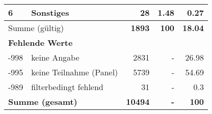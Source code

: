 \begin{longtable}{lXrrr}
     6 &
     \multicolumn{1}{X}{ Sonstiges   } &


       \num{28} &
       \num[round-mode=places,round-precision=2]{1.48} &
         \num[round-mode=places,round-precision=2]{0.27} \\
     \midrule
     \multicolumn{2}{l}{Summe (gültig)} &
       \textbf{\num{1893}} &
     \textbf{\num{100}} &
       \textbf{\num[round-mode=places,round-precision=2]{18.04}} \\
     \multicolumn{5}{l}{\textbf{Fehlende Werte}}\\
       -998 &
       keine Angabe &
         \num{2831} &
        - &
         \num[round-mode=places,round-precision=2]{26.98} \\
       -995 &
       keine Teilnahme (Panel) &
         \num{5739} &
        - &
         \num[round-mode=places,round-precision=2]{54.69} \\
       -989 &
       filterbedingt fehlend &
         \num{31} &
        - &
         \num[round-mode=places,round-precision=2]{0.3} \\
     \midrule
     \multicolumn{2}{l}{\textbf{Summe (gesamt)}} &
          \textbf{\num{10494}} &
        \textbf{-} &
        \textbf{\num{100}} \\
     \bottomrule
     \end{longtable}
     

